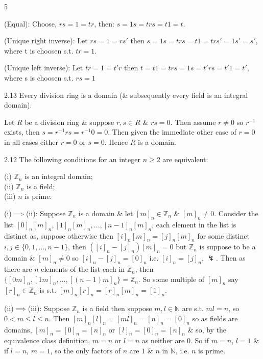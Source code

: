 \documentclass[8pt]{extarticle}
\makeatletter
\renewenvironment{proof}[1][\proofname]{%
  \par%
  \pushQED{\qed}%
  \normalfont
  \topsep=2pt\partopsep=0pt\parsep=0pt\itemsep=0pt%
  \trivlist
  \item[\hskip\labelsep\itshape #1\@addpunct{.}]\ignorespaces
}{%
  \popQED\endtrivlist\@endpefalse
  \vspace{-1pt}%
}
\makeatother
\begin{document}
\begin{multicols*}{5}
        \begin{proof}
            (Equal): Choose, \(rs=1=tr\), then: \(s=1s=trs=t1=t\).

            (Unique right inverse): Let \(rs=1=rs'\) then \(s=1s=trs=t1=trs'=1s'=s'\), where t is choosen s.t. \(tr=1\).

            (Unique left inverse): Let \(tr=1=t'r\) then \(t=t1=trs=1s=t'rs=t'1=t'\), where s is choosen s.t. \(rs=1\)
        \end{proof}

        \begin{proposition}{2.13}
            Every division ring is a domain (\& subsequently every field is an integral domain).
        \end{proposition}

        \begin{proof}
            Let \(R\) be a division ring \& suppose \(r,s\in R\) \& \(rs=0\). Then assume \(r\ne0\) so \(r^{-1}\) exists, then \(s=r^{-1}rs=r^{-1}0=0\). Then given the immediate other case of \(r=0\) in all cases either \(r=0\) or \(s=0\). Hence \(R\) is a domain.
        \end{proof}

        \begin{lemma}{2.12}
            The following conditions for an integer \(n\ge2\) are equivalent:

            (i) \(\mathbb{Z}_n\) is an integral domain;\\
            (ii) \(\mathbb{Z}_n\) is a field;\\
            (iii) \(n\) is prime.
        \end{lemma}

        \begin{proof}
            (i)\(\implies\)(ii):
            Suppose \(\mathbb{Z}_n\) is a domain \& let \([m]_n\in\mathbb{Z}_n\) \& \([m]_n\ne0\). Consider the list \([0]_n[m]_n,[1]_n[m]_n,\ldots,[n-1]_n[m]_n\), each element in the list is distinct as, suppose otherwise then \([i]_n[m]_n=[j]_n[m]_n\) for some distinct \(i,j\in\{0,1,\ldots,n-1\}\), then \(([i]_n-[j]_n)[m]_n=0\) but \(\mathbb{Z}_n\) is suppose to be a domain \& \([m]_n\ne0\) so \([i]_n-[j]_n=[0]_n\) i.e. \([i]_n=[j]_n\), \(\lightning\). Then as there are \(n\) elements of the list each in \(\mathbb{Z}_n\), then \(\{[0m]_n,[1m]_n,\ldots,[(n-1)m]_n\}=\mathbb{Z}_n\). So some multiple of \([m]_n\) say \([r]_n\in\mathbb{Z}_n\) is s.t. \([m]_n[r]_n=[r]_n[m]_n=[1]_n\).

            (ii)\(\implies\)(iii):
            Suppose \(\mathbb{Z}_n\) is a field then suppose \(m,l\in\mathbb{N}\) are s.t. \(ml=n\), so \(0<m\le l\le n\). Then \([m]_n[l]_n=[ml]_n=[n]_n=[0]_n\) so as fields are domains, \([m]_n=[0]_n=[n]_n\) or \([l]_n=[0]_n=[n]_n\) \& so, by the equivalence class definition, \(m=n\) or \(l=n\) as neither are \(0\). So if \(m=n\), \(l=1\) \& if \(l=n\), \(m=1\), so the only factors of \(n\) are \(1\) \& \(n\) in \(\mathbb{N}\), i.e. \(n\) is prime.


\end{proof}
\end{multicols*}
\end{document}
